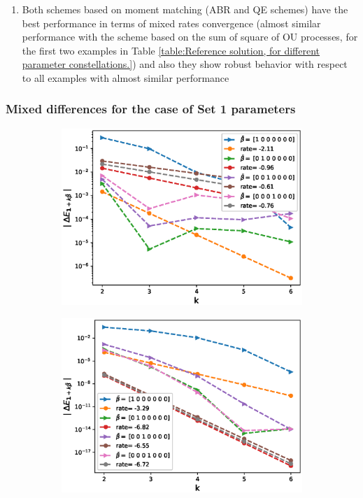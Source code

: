 \begin{enumerate}
\item  Both schemes based on moment matching (ABR and QE schemes) have the best performance in terms of mixed rates convergence (almost similar performance with the scheme based on the sum of square of OU processes, for the first two examples in Table \ref{table:Reference solution, for different parameter constellations.})  and also they show robust behavior with respect to all examples with almost similar performance
\end{enumerate}
 
 \subsubsection*{Mixed differences for the case of Set 1 parameters}
\FloatBarrier
\begin{figure}[htb]
	\centering %
	\begin{subfigure}{0.4\textwidth}
		\includegraphics[width=\linewidth]{./figures/Heston_single_call_full_truncation_vol/mixed_rates/set2/N_4/first_difference_heston_4steps_hierarchical_2}
		\caption{}
		\label{fig:1}
	\end{subfigure}\hfil %
	\begin{subfigure}{0.4\textwidth}
		\includegraphics[width=\linewidth]{./figures/Heston_single_call_ABR_moment_matching/mixed_rates/set2/N_4/first_difference_heston_4steps_hierarchical}

\end{subfigure}
\end{figure}
